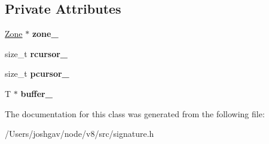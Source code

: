 \subsection*{Private Attributes}
\begin{DoxyCompactItemize}
\item 
\hyperlink{classv8_1_1internal_1_1_zone}{Zone} $\ast$ {\bfseries zone\+\_\+}\hypertarget{classv8_1_1internal_1_1_signature_1_1_builder_a1215dda828ad88f9b6521717d5d9c343}{}\label{classv8_1_1internal_1_1_signature_1_1_builder_a1215dda828ad88f9b6521717d5d9c343}

\item 
size\+\_\+t {\bfseries rcursor\+\_\+}\hypertarget{classv8_1_1internal_1_1_signature_1_1_builder_aaf169d294488456b1596db0119da88e5}{}\label{classv8_1_1internal_1_1_signature_1_1_builder_aaf169d294488456b1596db0119da88e5}

\item 
size\+\_\+t {\bfseries pcursor\+\_\+}\hypertarget{classv8_1_1internal_1_1_signature_1_1_builder_a73d2b6dac46940e73780f858b4435be9}{}\label{classv8_1_1internal_1_1_signature_1_1_builder_a73d2b6dac46940e73780f858b4435be9}

\item 
T $\ast$ {\bfseries buffer\+\_\+}\hypertarget{classv8_1_1internal_1_1_signature_1_1_builder_a1cc3f182f15e0d858c57adb18fb855cc}{}\label{classv8_1_1internal_1_1_signature_1_1_builder_a1cc3f182f15e0d858c57adb18fb855cc}

\end{DoxyCompactItemize}


The documentation for this class was generated from the following file\+:\begin{DoxyCompactItemize}
\item 
/\+Users/joshgav/node/v8/src/signature.\+h\end{DoxyCompactItemize}
